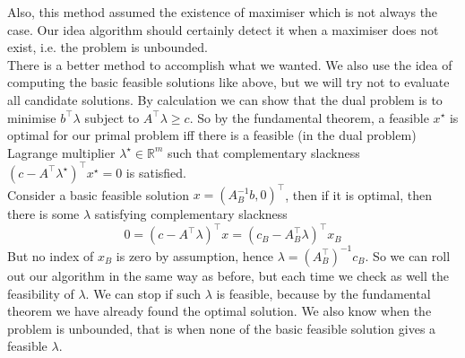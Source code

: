 Also, this method assumed the existence of maximiser which is not always the case.
Our idea algorithm should certainly detect it when a maximiser does not exist, i.e. the problem is unbounded.\\
There is a better method to accomplish what we wanted.
We also use the idea of computing the basic feasible solutions like above, but we will try not to evaluate all candidate solutions.
By calculation we can show that the dual problem is to minimise $b^\top\lambda$ subject to $A^\top\lambda\ge c$.
So by the fundamental theorem, a feasible $x^\star$ is optimal for our primal problem iff there is a feasible (in the dual problem) Lagrange multiplier $\lambda^\star\in\mathbb R^m$ such that complementary slackness $(c-A^\top\lambda^\star)^\top x^\star=0$ is satisfied.\\
Consider a basic feasible solution $x=(A_B^{-1}b,0)^\top$, then if it is optimal, then there is some $\lambda$ satisfying complementary slackness
$$0=(c-A^\top\lambda)^\top x=(c_B-A_B^\top\lambda)^\top x_B$$
But no index of $x_B$ is zero by assumption, hence $\lambda=(A_B^\top)^{-1}c_B$.
So we can roll out our algorithm in the same way as before, but each time we check as well the feasibility of $\lambda$.
We can stop if such $\lambda$ is feasible, because by the fundamental theorem we have already found the optimal solution.
We also know when the problem is unbounded, that is when none of the basic feasible solution gives a feasible $\lambda$.
